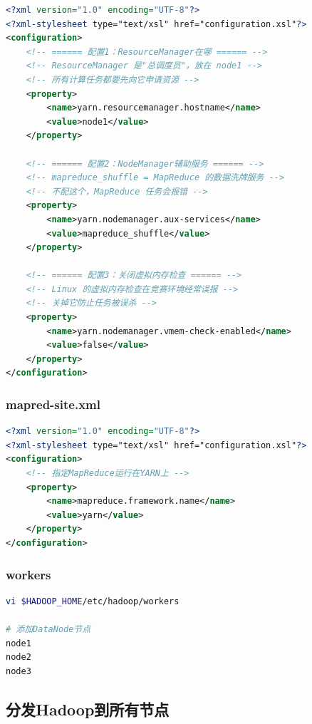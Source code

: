 \documentclass[12pt,a4paper]{article}
\begin{document}
\begin{lstlisting}[language=XML]
<?xml version="1.0" encoding="UTF-8"?>
<?xml-stylesheet type="text/xsl" href="configuration.xsl"?>
<configuration>
    <!-- ====== 配置1：ResourceManager在哪 ====== -->
    <!-- ResourceManager 是"总调度员"，放在 node1 -->
    <!-- 所有计算任务都要先向它申请资源 -->
    <property>
        <name>yarn.resourcemanager.hostname</name>
        <value>node1</value>
    </property>
    
    <!-- ====== 配置2：NodeManager辅助服务 ====== -->
    <!-- mapreduce_shuffle = MapReduce 的数据洗牌服务 -->
    <!-- 不配这个，MapReduce 任务会报错 -->
    <property>
        <name>yarn.nodemanager.aux-services</name>
        <value>mapreduce_shuffle</value>
    </property>
    
    <!-- ====== 配置3：关闭虚拟内存检查 ====== -->
    <!-- Linux 的虚拟内存检查在竞赛环境经常误报 -->
    <!-- 关掉它防止任务被误杀 -->
    <property>
        <name>yarn.nodemanager.vmem-check-enabled</name>
        <value>false</value>
    </property>
</configuration>
\end{lstlisting}

\subsubsection{mapred-site.xml}

\begin{lstlisting}[language=XML]
<?xml version="1.0" encoding="UTF-8"?>
<?xml-stylesheet type="text/xsl" href="configuration.xsl"?>
<configuration>
    <!-- 指定MapReduce运行在YARN上 -->
    <property>
        <name>mapreduce.framework.name</name>
        <value>yarn</value>
    </property>
</configuration>
\end{lstlisting}

\subsubsection{workers}

\begin{lstlisting}[language=bash]
vi $HADOOP_HOME/etc/hadoop/workers

# 添加DataNode节点
node1
node2
node3
\end{lstlisting}

\subsection{分发Hadoop到所有节点}
\end{document}
